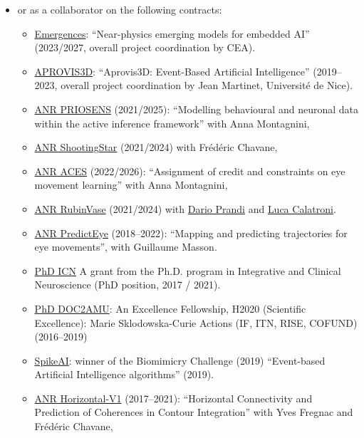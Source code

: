 \documentclass[10pt,english,a4paper,oneside]{article}%
\begin{document}
\begin{itemize}
\item or as a collaborator on the following contracts:
\begin{itemize}
	\item  \href{https://laurentperrinet.github.io/grant/emergences/}{Emergences}: ``Near-physics emerging models for embedded AI'' (2023/2027, overall project coordination by CEA).
	\item  \href{https://laurentperrinet.github.io/grant/aprovis-3-d/}{APROVIS3D}: ``Aprovis3D: Event-Based Artificial Intelligence'' (2019--2023, overall project coordination by Jean Martinet, Université de Nice).
 	\item \href{https://laurentperrinet.github.io/grant/anr-priosens/}{ANR PRIOSENS} (2021/2025): ``Modelling behavioural and neuronal data within the active inference framework'' with Anna Montagnini,
 	 \item \href{https://laurentperrinet.github.io/grant/anr-shootingstar/}{ANR ShootingStar} (2021/2024) with Frédéric Chavane,
	  \item \href{https://laurentperrinet.github.io/grant/anr-aces/}{ANR ACES} (2022/2026): ``Assignment of credit and constraints on eye movement learning'' with Anna Montagnini,
	  \item \href{https://laurentperrinet.github.io/grant/anr-rubinvase/}{ANR RubinVase} (2021/2024) with \href{https://scholar.google.com/citations?user=22p8Wc4AAAAJ}{Dario Prandi} and \href{https://scholar.google.com/citations?user=dRVPKmkAAAAJ}{Luca Calatroni}.
	  \item \href{https://laurentperrinet.github.io/grant/anr-predicteye/}{ANR PredictEye} (2018--2022): ``Mapping and predicting trajectories for eye movements'', with Guillaume Masson.
	\item \href{https://laurentperrinet.github.io/grant/phd-icn/}{PhD ICN} A grant from the Ph.D. program in Integrative and Clinical Neuroscience (PhD position, 2017 / 2021).
	\item  \href{https://laurentperrinet.github.io/grant/doc-2-amu/}{PhD DOC2AMU}: An Excellence Fellowship, H2020 (Scientific Excellence): Marie Sklodowska-Curie Actions (IF, ITN, RISE, COFUND) (2016--2019)
	\item  \href{https://laurentperrinet.github.io/grant/spikeai/}{SpikeAI}: winner of the Biomimicry Challenge (2019) ``Event-based Artificial Intelligence algorithms'' (2019).
	 \item \href{https://laurentperrinet.github.io/grant/anr-horizontal-v1/}{ANR Horizontal-V1} (2017--2021): ``Horizontal Connectivity and Prediction of Coherences in Contour Integration'' with Yves Fregnac and Frédéric Chavane,

\end{itemize}
\end{itemize}
\end{document}
